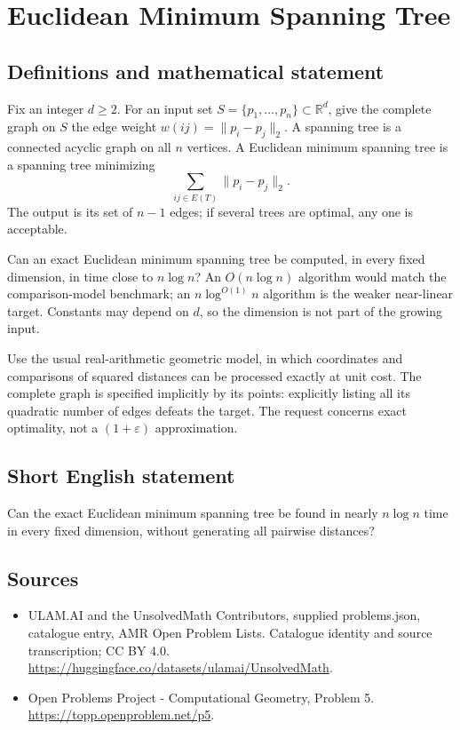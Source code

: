 \documentclass[11pt,a4paper]{article}
\begin{document}
\section*{Euclidean Minimum Spanning Tree}\label{statement}

\subsection{Definitions and mathematical statement}
Fix an integer $d\ge2$. For an input set $S=\{p_1,\ldots,p_n\}\subset
\mathbb R^d$, give the complete graph on $S$ the edge weight
$w(ij)=\|p_i-p_j\|_2$. A spanning tree is a connected acyclic graph on all
$n$ vertices. A Euclidean minimum spanning tree is a spanning tree
minimizing
\[
             \sum_{ij\in E(T)}\|p_i-p_j\|_2.
\]
The output is its set of $n-1$ edges; if several trees are optimal, any
one is acceptable.

Can an exact Euclidean minimum spanning tree be computed, in every fixed
dimension, in time close to $n\log n$? An $O(n\log n)$ algorithm would
match the comparison-model benchmark; an $n\log^{O(1)}n$ algorithm is
the weaker near-linear target. Constants may depend on $d$, so the
dimension is not part of the growing input.

Use the usual real-arithmetic geometric model, in which coordinates and
comparisons of squared distances can be processed exactly at unit cost.
The complete graph is specified implicitly by its points: explicitly
listing all its quadratic number of edges defeats the target. The
request concerns exact optimality, not a $(1+\varepsilon)$ approximation.
\subsection{Short English statement}
Can the exact Euclidean minimum spanning tree be found in nearly
$n\log n$ time in every fixed dimension, without generating all pairwise
distances?
\subsection{Sources}
\begin{itemize}
\item[S1] ULAM.AI and the UnsolvedMath Contributors, supplied problems.json, catalogue entry, AMR Open Problem Lists. Catalogue identity and source transcription; CC BY 4.0.
\url{https://huggingface.co/datasets/ulamai/UnsolvedMath}.
\item[S2] Open Problems Project - Computational Geometry, Problem 5. 
\url{https://topp.openproblem.net/p5}.
\end{itemize}
\end{document}
